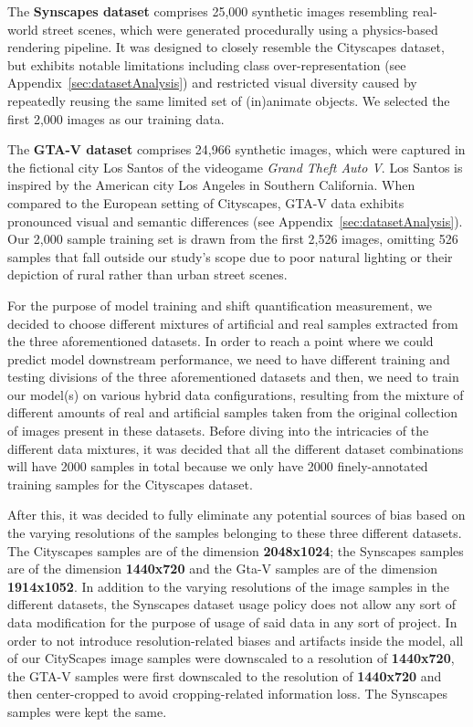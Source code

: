 \documentclass[conference]{IEEEtran}
\begin{document}
The \textbf{Synscapes dataset} \cite{synscapes} comprises 25,000 synthetic images resembling real-world street scenes, which were generated procedurally using a physics-based rendering pipeline. It was designed to closely resemble the Cityscapes dataset, but exhibits notable limitations including class over-representation (see Appendix~\ref{sec:datasetAnalysis}) and restricted visual diversity caused by repeatedly reusing the same limited set of (in)animate objects. We selected the first 2,000 images as our training data.
 

The \textbf{GTA-V dataset} \cite{GTA_V} comprises 24,966 synthetic images, which were captured in the fictional city Los Santos of the videogame \textit{Grand Theft Auto V}. Los Santos is inspired by the American city Los Angeles in Southern California. When compared to the European setting of Cityscapes, GTA-V data exhibits pronounced visual and semantic differences (see Appendix~\ref{sec:datasetAnalysis}). Our 2,000 sample training set is drawn from the first 2,526 images, omitting 526 samples that fall outside our study's scope due to poor natural lighting or their depiction of rural rather than urban street scenes.


For the purpose of model training and shift quantification measurement, we decided to choose different mixtures of artificial and real samples extracted from the three aforementioned datasets. In order to reach a point where we could predict model downstream performance, we need to have different training and testing divisions of the three aforementioned datasets and then, we need to train our model(s) on various hybrid data configurations, resulting from the mixture of different amounts of real and artificial samples taken from the original collection of images present in these datasets. Before diving into the intricacies of the different data mixtures, it was decided that all the different dataset combinations will have 2000 samples in total because we only have 2000 finely-annotated training samples for the Cityscapes dataset. 

After this, it was decided to fully eliminate any potential sources of bias based on the varying resolutions of the samples belonging to these three different datasets. The Cityscapes samples are of the dimension \textbf{2048x1024}; the Synscapes samples are of the dimension \textbf{1440x720} and the Gta-V samples are of the dimension \textbf{1914x1052}. In addition to the varying resolutions of the image samples in the different datasets, the Synscapes dataset usage policy does not allow any sort of data modification for the purpose of usage of said data in any sort of project. In order to not introduce resolution-related biases and artifacts inside the model, all of our CityScapes image samples were downscaled to a resolution of \textbf{1440x720}, the GTA-V samples were first downscaled to the resolution of \textbf{1440x720} and then center-cropped to avoid cropping-related information loss. The Synscapes samples were kept the same.
\end{document}
